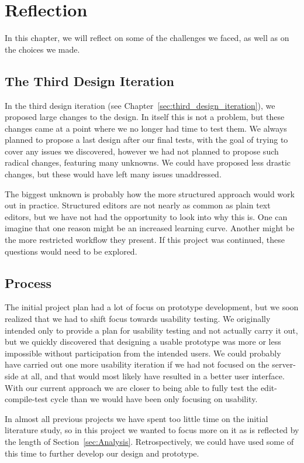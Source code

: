 \chapter{Reflection}
\label{sec:Reflection}
In this chapter, we will reflect on some of the challenges we faced, as well as on the choices we made.

\section{The Third Design Iteration}
In the third design iteration (see Chapter~\ref{sec:third_design_iteration}), we proposed large changes to the design.
In itself this is not a problem, but these changes came at a point where we no longer had time to test them.
We always planned to propose a last design after our final tests, with the goal of trying to cover any issues we discovered, however we had not planned to propose such radical changes, featuring many unknowns.
We could have proposed less drastic changes, but these would have left many issues unaddressed.

The biggest unknown is probably how the more structured approach would work out in practice.
Structured editors are not nearly as common as plain text editors, but we have not had the opportunity to look into why this is. 
One can imagine that one reason might be an increased learning curve. 
Another might be the more restricted workflow they present.
If this project was continued, these questions would need to be explored. 

\section{Process}
The initial project plan had a lot of focus on prototype development, but we
soon realized that we had to shift focus towards usability testing. We
originally intended only to provide a plan for usability testing and not
actually carry it out, but we quickly discovered that designing a usable prototype was more or less impossible without
participation from the intended users. We could probably have carried out one more
usability iteration if we had not focused on the server-side at all, and that
would most likely have resulted in a better user interface. With our
current approach we are closer to being able to fully test the
edit-compile-test cycle than we would have been only focusing on usability.

In almost all previous projects we have spent too little time on the initial literature
study, so in this project we wanted to focus more on it as is reflected by the
length of Section~\ref{sec:Analysis}. Retrospectively, we could have used some of this time to further develop our design and prototype. 

